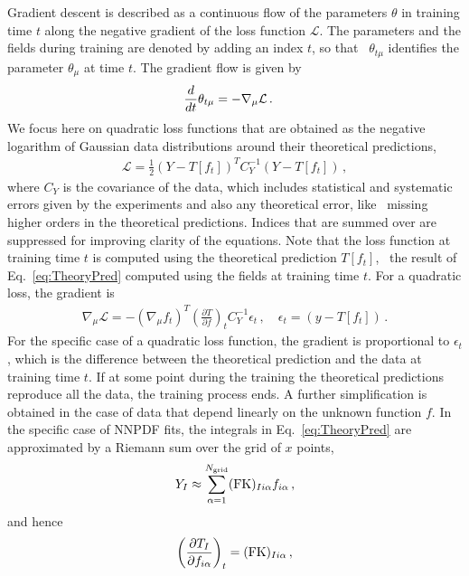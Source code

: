 \documentclass[11pt]{article}
\begin{document}
Gradient descent is described as a continuous flow of the parameters $\theta$ in training time $t$ 
along the negative gradient of the loss function $\mathcal{L}$. The parameters and the fields during
training are denoted by adding an index $t$, so that \eg\ $\theta_{t\mu}$ identifies the parameter
$\theta_\mu$ at time $t$. 
The gradient flow is given by 
\begin{align}
    \label{eq:GradientFlowDef}
    \frac{d}{dt} &\theta_{t\mu} = -\nabla_\mu \mathcal{L}\, .
\end{align}
We focus here on quadratic loss functions that are obtained as the negative logarithm of Gaussian 
data distributions around their theoretical predictions, 
\begin{align}
    \label{eq:QuadLoss}
    \mathcal{L} = \frac12 \left(Y - T[f_t]\right)^T C_Y^{-1} \left(Y - T[f_t]\right)\, ,
\end{align}
where $C_Y$ is the covariance of the data, which includes statistical and systematic errors given by 
the experiments and also any theoretical error, like \eg\ missing higher orders in the theoretical 
predictions. Indices that are summed over are suppressed for improving clarity of the equations. 
Note that the loss function at training time $t$ is computed using the theoretical prediction $T[f_t]$,
\ie\ the result of Eq.~\eqref{eq:TheoryPred} computed using the fields at training time $t$. For a quadratic 
loss, the gradient is
\begin{align}
    \nabla_\mu \mathcal{L} = - \left(\nabla_\mu f_t\right)^T \left(\frac{\partial T}{\partial f}\right)_t
      C_Y^{-1} \epsilon_t\, , \quad \epsilon_t = \left(y - T[f_t]\right)\, .
\end{align}
For the specific case of a quadratic loss function, the gradient is proportional to $\epsilon_t$, which 
is the difference between the theoretical prediction and the data at training time $t$. If at some point 
during the training the theoretical predictions reproduce all the data, the training process ends. 
A further simplification is obtained in the case of data that depend linearly on the unknown function $f$. 
In the specific case of NNPDF fits, the integrals in Eq.~\eqref{eq:TheoryPred} are approximated by 
a Riemann sum over the grid of $x$ points, 
\begin{align}
    \label{eq:FKTabDef}
    Y_I \approx \sum_{\alpha=1}^{N_{\mathrm{grid}}} (\mathrm{FK})_{Ii\alpha} f_{i\alpha}\, ,
\end{align}
and hence 
\begin{align}
    \label{eq:dTbydf}
    \left(\frac{\partial T_I}{\partial f_{i\alpha}}\right)_t = 
        (\mathrm{FK})_{Ii\alpha}\, ,
\end{align}
\end{document}
